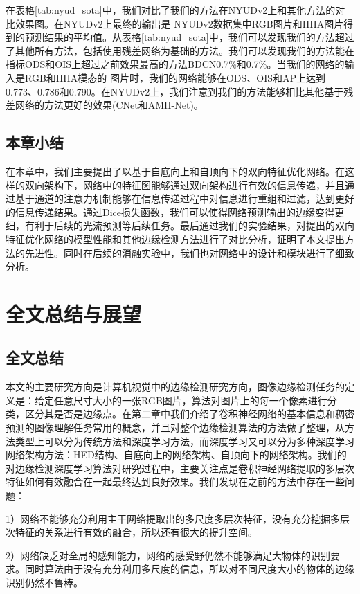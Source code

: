 \documentclass[master]{thesis-uestc}
\begin{document}
在表格\ref{tab:nyud_sota}中，我们对比了我们的方法在NYUDv2上和其他方法的对比效果图。在NYUDv2上最终的输出是 NYUDv2数据集中RGB图片和HHA图片得到的预测结果的平均值。从表格\ref{tab:nyud_sota}中，我们可以发现我们的方法超过了其他所有方法，包括使用残差网络为基础的方法。我们可以发现我们的方法能在指标ODS和OIS上超过之前效果最高的方法BDCN0.7\%和0.7\%。当我们的网络的输入是RGB和HHA模态的 图片时，我们的网络能够在ODS、OIS和AP上达到0.773、0.786和0.790。在NYUDv2上，我们注意到我们的方法能够相比其他基于残差网络的方法更好的效果(CNet和AMH-Net)。

\section{本章小结}
在本章中，我们主要提出了以基于自底向上和自顶向下的双向特征优化网络。在这样的双向架构下，网络中的特征图能够通过双向架构进行有效的信息传递，并且通过基于通道的注意力机制能够在信息传递过程中对信息进行重组和过滤，达到更好的信息传递结果。通过Dice损失函数，我们可以使得网络预测输出的边缘变得更细，有利于后续的光流预测等后续任务。最后通过我们的实验结果，对提出的双向特征优化网络的模型性能和其他边缘检测方法进行了对比分析，证明了本文提出方法的先进性。同时在后续的消融实验中，我们也对网络中的设计和模块进行了细致分析。

\chapter{全文总结与展望}


\section{全文总结}
本文的主要研究方向是计算机视觉中的边缘检测研究方向，图像边缘检测任务的定义是：给定任意尺寸大小的一张RGB图片，算法对图片上的每一个像素进行分类，区分其是否是边缘点。在第二章中我们介绍了卷积神经网络的基本信息和稠密预测的图像理解任务常用的概念，并且对整个边缘检测算法的方法做了整理，从方法类型上可以分为传统方法和深度学习方法，而深度学习又可以分为多种深度学习网络架构方法：HED结构、自底向上的网络架构、自顶向下的网络架构。我们的对边缘检测深度学习算法对研究过程中，主要关注点是卷积神经网络提取的多层次特征如何有效融合在一起最终达到良好效果。我们发现在之前的方法中存在一些问题：

1）网络不能够充分利用主干网络提取出的多尺度多层次特征，没有充分挖掘多层次特征的关系进行有效的融合，所以还有很大的提升空间。

2）网络缺乏对全局的感知能力，网络的感受野仍然不能够满足大物体的识别要求。同时算法由于没有充分利用多尺度的信息，所以对不同尺度大小的物体的边缘识别仍然不鲁棒。
\end{document}
